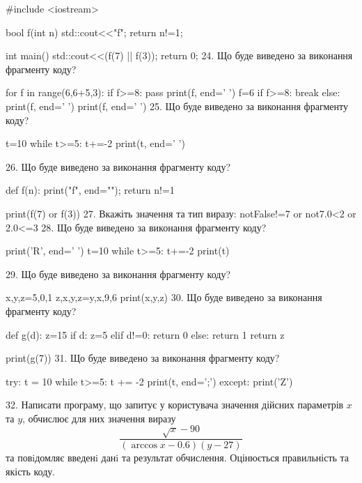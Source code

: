 \documentclass[11pt]{article}
\begin{document}
#include <iostream>

bool f(int n){
    std::cout<<"f";
    return n!=1;
}

int main(){
    std::cout<<(f(7) || f(3));
    return 0;
}
\vspace{5mm}
24. Що буде виведено за виконання фрагменту коду?

for f in range(6,6+5,3):
    if f>=8:
        pass
    print(f, end=' ')
    f=6
    if f>=8:
        break
else:
    print(f, end=' ')
print(f, end=' ')
\vspace{5mm}
25. Що буде виведено за виконання фрагменту коду?

t=10
while t>=5:
    t+=-2
print(t, end=' ')

\vspace{5mm}
26. Що буде виведено за виконання фрагменту коду?

def f(n):
    print("f", end="");
    return n!=1

print(f(7) or f(3))
\vspace{5mm}
27. 
Вкажіть значення та тип виразу:
notFalse!=7 or not7.0<2 or 2.0<=3
\vspace{5mm}
28. Що буде виведено за виконання фрагменту коду?

print('R', end=' ')
t=10
while t>=5:
    t+=-2
print(t)

\vspace{5mm}
29. Що буде виведено за виконання фрагменту коду?

x,y,z=5,0,1
z,x,y,z=y,x,9,6
print(x,y,z)
\vspace{5mm}
30. Що буде виведено за виконання фрагменту коду?

def g(d):
    z=15
    if d: 
        z=5
    elif d!=0:
         return 0
    else:
         return 1
    return z

print(g(7))
\vspace{5mm}
31. Що буде виведено за виконання фрагменту коду?

try:
    t = 10
    while t>=5:
        t += -2
    print(t, end=';')
except:
    print('Z')

\vspace{5mm}
32. 
Написати програму, що запитує у користувача значення дійсних параметрів $x$ та $y$, обчислює для них значення виразу 
$$\frac{\sqrt x - 90}{(\arccos x - 0.6) (y - 27)}$$ 
та повiдомляє введенi данi та результат обчислення.
 Оцінюється правильність та якість коду.
\end{document}
